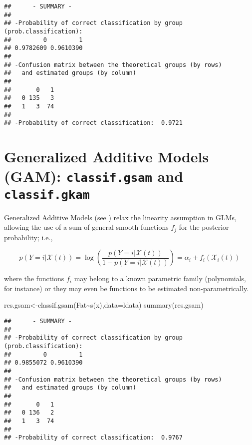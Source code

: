 \documentclass[
]{book}
\newenvironment{Shaded}{\begin{snugshade}}{\end{snugshade}}
\newcommand{\AttributeTok}[1]{\textcolor[rgb]{0.77,0.63,0.00}{#1}}
\newcommand{\FunctionTok}[1]{\textcolor[rgb]{0.00,0.00,0.00}{#1}}
\newcommand{\NormalTok}[1]{#1}
\newcommand{\OtherTok}[1]{\textcolor[rgb]{0.56,0.35,0.01}{#1}}
\newcommand{\SpecialCharTok}[1]{\textcolor[rgb]{0.00,0.00,0.00}{#1}}
\begin{document}
\begin{verbatim}
##      - SUMMARY - 
## 
## -Probability of correct classification by group (prob.classification):
##         0         1 
## 0.9782609 0.9610390 
## 
## -Confusion matrix between the theoretical groups (by rows)
##   and estimated groups (by column) 
##    
##       0   1
##   0 135   3
##   1   3  74
## 
## -Probability of correct classification:  0.9721
\end{verbatim}

\hypertarget{generalized-additive-models-gam-classif.gsam-and-classif.gkam}{%
\section{\texorpdfstring{Generalized Additive Models (GAM): \texttt{classif.gsam} and \texttt{classif.gkam}}{Generalized Additive Models (GAM): classif.gsam and classif.gkam}}\label{generalized-additive-models-gam-classif.gsam-and-classif.gkam}}

Generalized Additive Models (see \citet{wood2004}) relax the linearity assumption in GLMs, allowing the use of a sum of general smooth functions \(f_j\) for the posterior probability; i.e.,

\[  p(Y=i|\mathcal{X}(t))=\log \left(\frac{p(Y=i|\mathcal{X}(t))}{1-p(Y=i|\mathcal{X}(t))}\right)=\alpha_i+  f_i\left(\mathcal{X}_{i}(t)\right)\]

where the functions \(f_{i}\) may belong to a known parametric family (polynomials, for instance) or they may even be functions to be estimated non-parametrically.

\begin{Shaded}
\begin{Highlighting}[]
\NormalTok{res.gsam}\OtherTok{\textless{}{-}}\FunctionTok{classif.gsam}\NormalTok{(Fat}\SpecialCharTok{\textasciitilde{}}\FunctionTok{s}\NormalTok{(x),}\AttributeTok{data=}\NormalTok{ldata)}
\FunctionTok{summary}\NormalTok{(res.gsam)}
\end{Highlighting}
\end{Shaded}

\begin{verbatim}
##      - SUMMARY - 
## 
## -Probability of correct classification by group (prob.classification):
##         0         1 
## 0.9855072 0.9610390 
## 
## -Confusion matrix between the theoretical groups (by rows)
##   and estimated groups (by column) 
##    
##       0   1
##   0 136   2
##   1   3  74
## 
## -Probability of correct classification:  0.9767
\end{verbatim}
\end{document}
